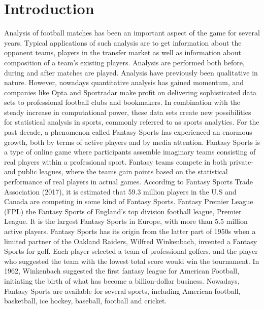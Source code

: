 
\pagestyle{fancy}
\fancyhf{}
\renewcommand{\chaptermark}[1]{\markboth{\chaptername\ \thechapter.\ #1}{}}
\renewcommand{\sectionmark}[1]{\markright{\thesection\ #1}}
\renewcommand{\headrulewidth}{0.1ex}
\renewcommand{\footrulewidth}{0.1ex}
\fancyfoot[LE,RO]{\thepage}
\fancyhead[LE]{\leftmark}
\fancyhead[RO]{\rightmark}
\fancypagestyle{plain}{\fancyhf{}\fancyfoot[LE,RO]{\thepage}\renewcommand{\headrulewidth}{0ex}}

\setcounter{page}{1}

\chapter{Introduction}\label{introduction}
Analysis of football matches has been an important aspect of the game for several years. Typical applications of such analysis are to get information about the opponent teams, players in the transfer market as well as information about composition of a team's existing players. Analysis are performed both before, during and after matches are played. Analysis have previously been qualitative in nature. However, nowadays quantitative analysis has gained momentum, and companies like Opta and Sportradar make profit on delivering sophisticated data sets to professional football clubs and bookmakers. In combination with the steady increase
in computational power, these data sets create new possibilities for statistical analysis in sports,
commonly referred to as sports analytics.
\newpar
For the past decade, a phenomenon called Fantasy Sports has experienced an enormous growth, both by terms of active players and by media attention. Fantasy Sports is a type of online game where participants assemble imaginary teams consisting of real players within a professional sport. Fantasy teams compete in both private- and public leagues, where the teams gain points based on the statistical performance of real players in actual games. According to Fantasy Sports Trade Association (2017), it is estimated that 59.3 million players in the U.S and Canada are competing in some kind of Fantasy Sports. Fantasy Premier League (FPL) the Fantasy Sports of England's top division football league, Premier League. It is the largest Fantasy Sports in Europe, with more than 5.5 million active players. 
\newpar
Fantasy Sports has its origin from the latter part of 1950s when a limited partner of the Oakland Raiders, Wilfred Winkenbach, invented a Fantasy Sports for golf. Each player selected a team of professional golfers, and the player who suggested the team with the lowest total score would win the tournament. In 1962, Winkenbach suggested the first fantasy league for American Football, initiating the birth of what has become a billion-dollar business. Nowadays, Fantasy Sports are available for several sports, including American football, basketball, ice hockey, baseball, football and cricket.  
